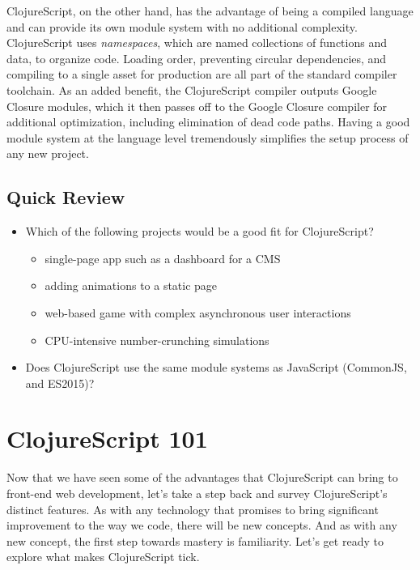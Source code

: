 \documentclass[10pt,twoside,openright]{memoir}
\begin{document}
ClojureScript, on the other hand, has the advantage of being a compiled
language and can provide its own module system with no additional
complexity. ClojureScript uses \emph{namespaces}, which are named
collections of functions and data, to organize code. Loading order,
preventing circular dependencies, and compiling to a single asset for
production are all part of the standard compiler toolchain. As an added
benefit, the ClojureScript compiler outputs Google Closure modules,
which it then passes off to the Google Closure compiler for additional
optimization, including elimination of dead code paths. Having a good
module system at the language level tremendously simplifies the setup
process of any new project.

\subsection{Quick Review}

\begin{itemize}
\tightlist
\item
  Which of the following projects would be a good fit for ClojureScript?

  \begin{itemize}
  \tightlist
  \item
    single-page app such as a dashboard for a CMS
  \item
    adding animations to a static page
  \item
    web-based game with complex asynchronous user interactions
  \item
    CPU-intensive number-crunching simulations
  \end{itemize}
\item
  Does ClojureScript use the same module systems as JavaScript
  (CommonJS, and ES2015)?
\end{itemize}

\section{ClojureScript 101}

Now that we have seen some of the advantages that ClojureScript can
bring to front-end web development, let's take a step back and survey
ClojureScript's distinct features. As with any technology that promises
to bring significant improvement to the way we code, there will be new
concepts. And as with any new concept, the first step towards mastery is
familiarity. Let's get ready to explore what makes ClojureScript tick.
\end{document}
